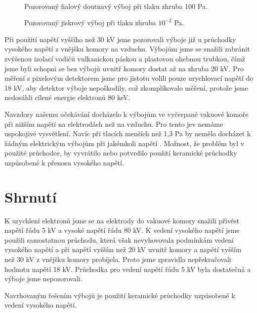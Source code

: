 \begin{figure}[h!]
\begin{minipage}[c]{200pt}
\end{minipage}
\\
\begin{minipage}[c]{200pt}
\caption[Pozorovaný doutnavý výboj]{Pozorovaný fialový doutnavý výboj při tlaku zhruba 100 Pa.  }
\label{obr:fialovy_vyboj}
\end{minipage}
\begin{minipage}[c]{5pt}
\end{minipage}
\begin{minipage}[c]{200pt}
\caption[Pozorovaný jiskrový výboj]{Pozorovaný jiskrový výboj při tlaku zhruba $10^{-2}$ Pa.}
\label{obr:jiskra}
\end{minipage}
\end{figure}


\par Při použití napětí vyššího než 30 kV jsme pozorovali výboje již u průchodky vysokého napětí z vnějšku komory na vzduchu. Výbojům jsme se snažili zabránit zvýšenou izolací vodičů vulkanickou páskou a plastovou ohebnou trubkou, čímž jsme byli schopni se bez výbojů uvnitř komory dostat až na zhruba 20 kV. Pro měření s pixelovým detektorem jsme pro jistotu volili pouze urychlovací napětí do 18 kV, aby detektor výboje nepoškodily, což zkomplikovalo měření, protože jsme nedosáhli cílené energie elektronů 80 keV.
\par Navzdory našemu očekávání docházelo k výbojům ve vyčerpané vakuové komoře při nižším napětí na elektrodách než na vzduchu. Pro tento jev nemáme uspokojivé vysvětlení. Navíc při tlacích menších než 1,3 Pa by nemělo docházet k žádným elektrickým výbojům při jakémkoli napětí \cite{ellion}. Možnost, že problém byl v použité průchodce, by vyvrátilo nebo potvrdilo použití keramické průchodky uzpůsobené k přenosu vysokého napětí.



\section{Shrnutí}
\par K urychlení elektronů jsme se na elektrody do vakuové komory snažili přivést napětí řádu 5 kV a vysoké napětí řádu 80 kV. K vedení vysokého napětí jsme použili samostatnou průchodu, která však nevyhovovala podmínkám vedení vysokého napětí a při napětí vyšším než 20 kV uvnitř komory a napětí vyšším než 30 kV z vnějšku komory probíjela. Proto jsme zpravidla nepřekračovali hodnotu napětí 18 kV. Průchodka pro vedení napětí řádu 5 kV byla dostatečná a výboje jsme nepozorovali.
\par Navrhovaným řešením výbojů je použití keramické průchodky uzpůsobené k vedení vysokého napětí.
